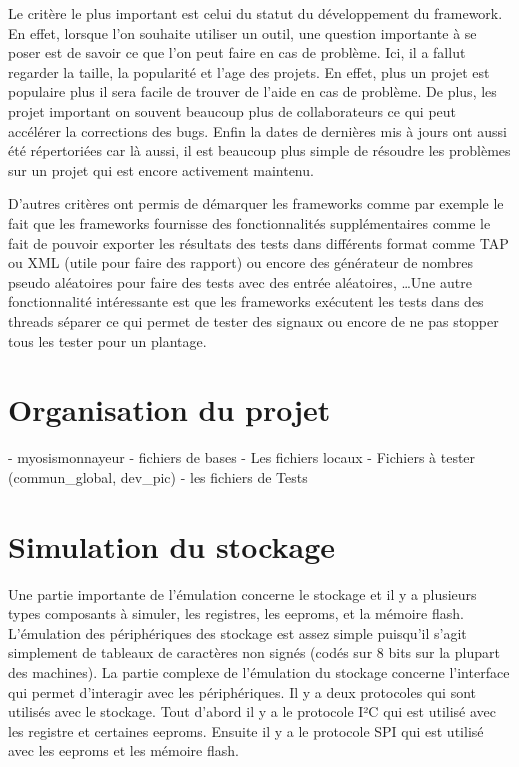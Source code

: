 \documentclass[a4paper]{article}
\begin{document}
Le critère le plus important est celui du statut du développement du framework.
En effet, lorsque l'on souhaite utiliser un outil, une question importante à se
poser est de savoir ce que l'on peut faire en cas de problème. Ici, il a fallut
regarder la taille, la popularité et l'age des projets. En effet, plus un projet
est populaire plus il sera facile de trouver de l'aide en cas de problème. De
plus, les projet important on souvent beaucoup plus de collaborateurs ce qui
peut accélérer la corrections des bugs. Enfin la dates de dernières mis à jours
ont aussi été répertoriées car là aussi, il est beaucoup plus simple de résoudre
les problèmes sur un projet qui est encore activement maintenu.

D'autres critères ont permis de démarquer les frameworks comme par exemple le
fait que les frameworks fournisse des fonctionnalités supplémentaires comme le
fait de pouvoir exporter les résultats des tests dans différents format comme
TAP ou XML (utile pour faire des rapport) ou encore des générateur de nombres
pseudo aléatoires pour faire des tests avec des entrée aléatoires, \dots Une
autre fonctionnalité intéressante est que les frameworks exécutent les tests
dans des threads séparer ce qui permet de tester des signaux ou encore de ne pas
stopper tous les tester pour un plantage.


\section{Organisation du projet}

- myosismonnayeur
- fichiers de bases
  - Les fichiers locaux
  - Fichiers à tester (commun\_global, dev\_pic)
- les fichiers de Tests

\section{Simulation du stockage}

Une partie importante de l'émulation concerne le stockage et il y a plusieurs
types composants à simuler, les registres, les eeproms, et la mémoire flash.
L'émulation des périphériques des stockage est assez simple puisqu'il s'agit
simplement de tableaux de caractères non signés (codés sur 8 bits sur la plupart
des machines). La partie complexe de l'émulation du stockage concerne
l'interface qui permet d'interagir avec les périphériques. Il y a deux
protocoles qui sont utilisés avec le stockage. Tout d'abord il y a le protocole
I²C qui est utilisé avec les registre et certaines eeproms. Ensuite il y a le
protocole SPI qui est utilisé avec les eeproms et les mémoire flash.
\end{document}

